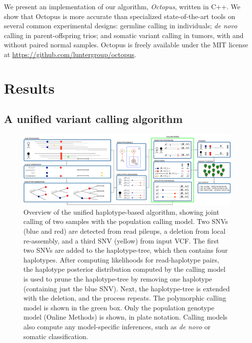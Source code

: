\documentclass[notitlepage, twocolumn, 10pt]{article}
\begin{document}
We present an implementation of our algorithm, \emph{Octopus}, written in C++. We show that Octopus is more accurate than specialized state-of-the-art tools on several common experimental designs: germline calling in individuals; \textit{de novo} calling in parent-offspring trios; and somatic variant calling in tumors, with and without paired normal samples. Octopus 
is freely available under the MIT license at \url{https://github.com/luntergroup/octopus}.

\section*{Results}

\subsection*{A unified variant calling algorithm}

\begin{figure}[ht!]
    \includegraphics[width=\textwidth]{figures/method}
    \caption{Overview of the unified haplotype-based algorithm, showing joint calling of two samples with the population calling model. Two SNVs (blue and red) are detected from read pileups, a deletion from local re-assembly, and a third SNV (yellow) from input VCF. The first two SNVs are added to the haplotype-tree, which then contains four haplotypes. After computing likelihoods for read-haplotype pairs, the haplotype posterior distribution computed by the calling model is used to prune the haplotype-tree by removing one haplotype (containing just the blue SNV). Next, the haplotype-tree is extended with the deletion, and the process repeats. The polymorphic calling model is shown in the green box. 
    Only the population genotype model (Online Methods) is shown, in plate notation. Calling models also compute any model-specific inferences, such as \textit{de novo} or somatic classification.}
    \label{fig:method}
\end{figure}
\end{document}
